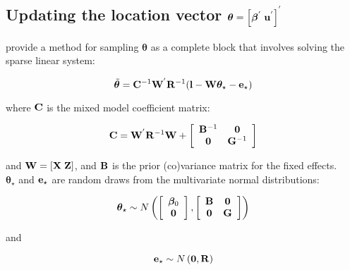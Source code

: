 \documentclass{article}
\begin{document}
\subsection[Updating the location vector]{Updating the location vector ${\bm \theta} =  \left[{\bm \beta}^{'}\; {\bf u}^{'}\right]^{'}$}

\citet{Garcia-Cortes.2001} provide a method for sampling ${\bm \theta}$ as a complete block that involves solving the sparse linear system:

\begin{equation}
\tilde{\bm \theta} = {\bf C}^{-1}{\bf W}^{'}{\bf R}^{-1}({\bf l} - {\bf W}{\bm \theta}_{\star}-{\bf e}_{\star})
\label{sMME-Eq}
\end{equation}

where ${\bf C}$ is the mixed model coefficient matrix:

\begin{equation}
{\bf C} = {\bf W}^{'}{\bf R}^{-1}{\bf W}+
\left[
\begin{array}{c c}
{\bf B}^{-1}&{\bf 0}\\
{\bf 0}&{\bf G}^{-1}\\
\end{array}
\right]
\end{equation}

and ${\bf W} = \left[{\bf X}\; {\bf Z}\right]$, and ${\bf B}$ is the prior (co)variance matrix for the fixed effects.\\

${\bm \theta}_{\star}$ and ${\bf e}_{\star}$ are random draws from the multivariate normal distributions:

\begin{equation}
{\bm \theta}_{\star} \sim N\left(
\left[
\begin{array}{c}
{\bm \beta_{0}}\\
{\bf 0}\\
\end{array}
\right]
,
\left[
\begin{array}{c c}
{\bf B}&{\bf 0}\\
{\bf 0}&{\bf G}\\
\end{array}
\right]
\right)
\end{equation}

and 

\begin{equation}
{\bf e}_{\star} \sim N\left({\bf 0},{\bf R}\right)
\end{equation}
\end{document}
